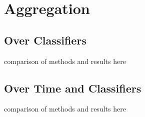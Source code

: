 \section{Aggregation}
\label{sec:exp-agg}

    \subsection{Over Classifiers}
    \label{subsec:exp-agg-clf}
        comparison of methods and results here
    
    \subsection{Over Time and Classifiers}
    \label{subsec:exp-agg-time}
        comparison of methods and results here
   